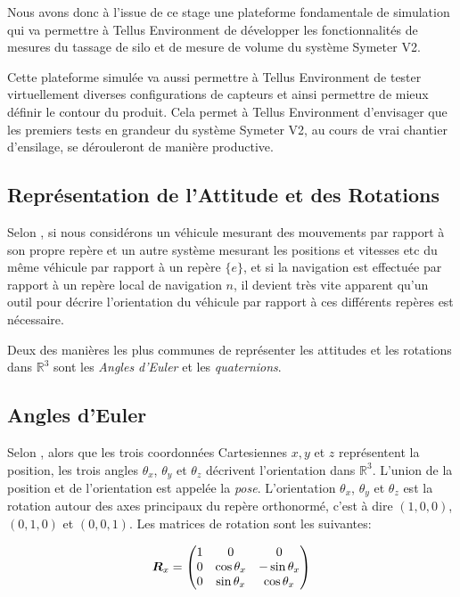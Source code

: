 \documentclass[12pt,a4paper]{report}
\begin{document}
\para Nous avons donc à l'issue de ce stage une plateforme fondamentale de simulation qui va permettre à Tellus Environment de développer les fonctionnalités de mesures du tassage de silo et de mesure de volume du système Symeter V2. 

\para Cette plateforme simulée va aussi permettre à Tellus Environment de tester virtuellement diverses configurations de capteurs et ainsi permettre de mieux définir le contour du produit. Cela permet à Tellus Environment d'envisager que les premiers tests en grandeur du système Symeter V2, au cours de vrai chantier d'ensilage, se dérouleront de manière productive.



\begin{appendix}
	\chapter{Représentation de l'Attitude et des Rotations}
	\label{app:a}
	Selon \cite{gustavsson_uav_2015}, si nous considérons un véhicule mesurant des mouvements par rapport à son propre repère et un autre système mesurant les positions et vitesses etc du même véhicule par rapport à un repère $\{e\}$, et si la navigation est effectuée par rapport à un repère local de navigation ${n}$, il devient très vite apparent qu'un outil pour décrire l'orientation du véhicule par rapport à ces différents repères est nécessaire.
	
	\para Deux des manières les plus communes de représenter les attitudes et les rotations dans $\mathbb{R}^3$ sont les \textit{Angles d'Euler} et les \textit{quaternions}.
		\section{Angles d'Euler}
		Selon \cite{nuchter_3d_2009}, alors que les trois coordonnées Cartesiennes $x,y$ et $z$ représentent la position, les trois angles $\theta_x$, $\theta_y$ et $\theta_z$ décrivent l'orientation dans $\mathbb{R}^3$. L'union de la position et de l'orientation est appelée la \textit{pose}. L'orientation $\theta_x$, $\theta_y$ et $\theta_z$ est la rotation autour des axes principaux du repère orthonormé, c'est à dire $(1,0,0)$, $(0,1,0)$ et $(0,0,1)$. Les matrices de rotation sont les suivantes:
		
		\begin{equation*}
		\boldsymbol{R}_x =	\begin{pmatrix}
		1 & 0 & 0 \\
		0 & \cos{\theta_x} & -\sin{\theta_x}\\
		0 & \sin{\theta_x} & \cos{\theta_x}
		

\end{pmatrix}
\end{equation*}
\end{appendix}
\end{document}
